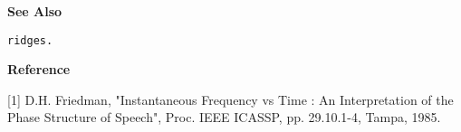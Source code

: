 \newpage

{\bf \large {}\selectfont See Also}\\
\hspace*{1.5cm}
\begin{minipage}[t]{13.5cm}
\begin{verbatim}
ridges.
\end{verbatim}
\end{minipage}
\vspace*{.5cm}


{\bf \large {}\selectfont Reference}\\
\hspace*{1.5cm}
\begin{minipage}[t]{13.5cm}
[1] D.H. Friedman, "Instantaneous Frequency vs Time : An
Interpretation of the Phase Structure of Speech", Proc. IEEE
ICASSP, pp. 29.10.1-4, Tampa, 1985.	
\end{minipage}




